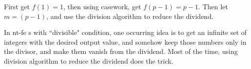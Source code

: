 First get $ f(1)=1 $, then using casework, get $ f(p-1)=p-1 $. Then let $ m=(p-1) $, and use the division algorithm to reduce the dividend.

\begin{Remark}
	In nt-fe s with ``divisible" condition, one occurring idea is to get an infinite set of integers with the desired output value, and somehow keep those numbers only in the divisor, and make them vanish from the dividend. Most of the time, using division algorithm to reduce the dividend does the trick.
\end{Remark}